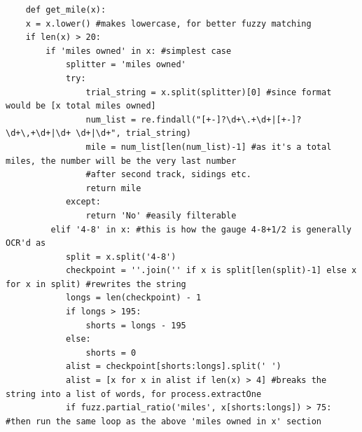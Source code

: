 \begin{lstlisting}
    def get_mile(x):
    x = x.lower() #makes lowercase, for better fuzzy matching
    if len(x) > 20:
        if 'miles owned' in x: #simplest case
            splitter = 'miles owned'
            try:
                trial_string = x.split(splitter)[0] #since format would be [x total miles owned]
                num_list = re.findall("[+-]?\d+\.+\d+|[+-]?\d+\,+\d+|\d+ \d+|\d+", trial_string)
                mile = num_list[len(num_list)-1] #as it's a total miles, the number will be the very last number
                #after second track, sidings etc.
                return mile
            except:
                return 'No' #easily filterable
         elif '4-8' in x: #this is how the gauge 4-8+1/2 is generally OCR'd as
            split = x.split('4-8') 
            checkpoint = ''.join('' if x is split[len(split)-1] else x for x in split) #rewrites the string
            longs = len(checkpoint) - 1
            if longs > 195:
                shorts = longs - 195
            else:
                shorts = 0
            alist = checkpoint[shorts:longs].split(' ')
            alist = [x for x in alist if len(x) > 4] #breaks the string into a list of words, for process.extractOne
            if fuzz.partial_ratio('miles', x[shorts:longs]) > 75: #then run the same loop as the above 'miles owned in x' section
\end{lstlisting}


